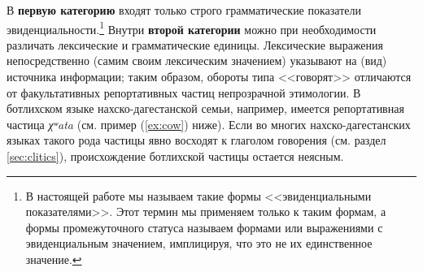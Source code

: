 
В \textbf{первую категорию} входят только строго грамматические показатели эвиденциальности.\footnote{В настоящей работе мы называем такие формы <<эвиденциальными показателями>>. Этот термин мы применяем только к таким формам, а формы промежуточного статуса называем формами или выражениями с эвиденциальным значением, имплицируя, что это не их единственное значение.} %
Внутри \textbf{второй категории} можно при необходимости различать лексические и грамматические единицы. Лексические выражения непосредственно (самим своим лексическим значением) указывают на (вид) источника информации; таким образом, обороты типа <<говорят>> отличаются от факультативных репортативных частиц непрозрачной этимологии. В ботлихском языке нахско-дагестанской семьи, например, имеется репортативная частица \textit{χʷata} (см. пример (\ref{ex:cow}) ниже). Если во многих нахско-дагестанских языках такого рода частицы явно восходят к глаголом говорения (см. раздел \ref{sec:clitics}), происхождение ботлихской частицы остается неясным. 

